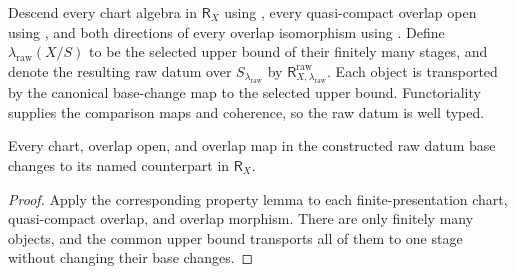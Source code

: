 \begin{definition}
  \label{def:nagata-relative-gluing-datum-descent}

  Descend every chart algebra in $\mathsf R_X$ using
  , every quasi-compact overlap open
  using , and both directions of every
  overlap isomorphism using .  Define
  $\lambda_{\mathrm{raw}}(X/S)$ to be the selected
  upper bound of their finitely many stages, and denote the resulting raw
  datum over $S_{\lambda_{\mathrm{raw}}}$ by
  $\mathsf R_{X,\lambda_{\mathrm{raw}}}^{\mathrm{raw}}$.
  Each object is transported by the canonical base-change map to the selected
  upper bound. Functoriality supplies the comparison maps and coherence, so
  the raw datum is well typed.
\end{definition}

\begin{lemma}
  \label{lemma:nagata-relative-gluing-datum-descends}

  Every chart, overlap open, and overlap map in the constructed raw datum
  base changes to its named counterpart in $\mathsf R_X$.
\end{lemma}

\begin{proof}
  Apply the corresponding property lemma to each finite-presentation chart,
  quasi-compact overlap, and overlap morphism.  There are only finitely many
  objects, and the common upper bound transports all of them to one stage
  without changing their base changes.
\end{proof}

